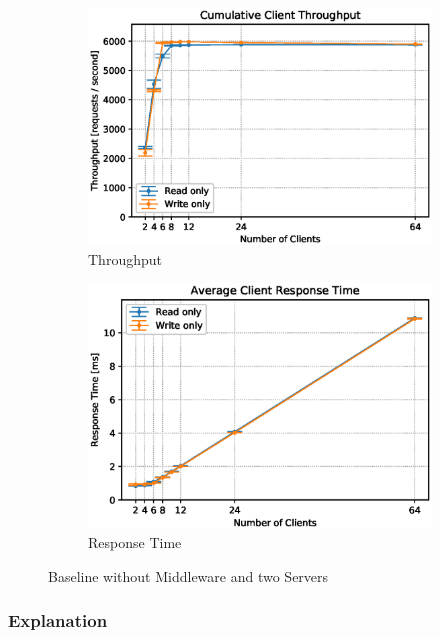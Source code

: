 \documentclass[11pt,a4paper]{article}
\begin{document}
\begin{figure}
    \begin{subfigure}{.5\textwidth}
        \includegraphics[width=1\linewidth]{plots/2_2_throughput.eps}
        \caption{Throughput}
    \end{subfigure}
    \begin{subfigure}{.5\textwidth}
        \includegraphics[width=1\linewidth]{plots/2_2_latency.eps}
        \caption{Response Time}
    \end{subfigure}
    \caption{Baseline without Middleware and two Servers}
    \label{fig:2-2}
\end{figure}
\subsubsection{Explanation}
\end{document}
